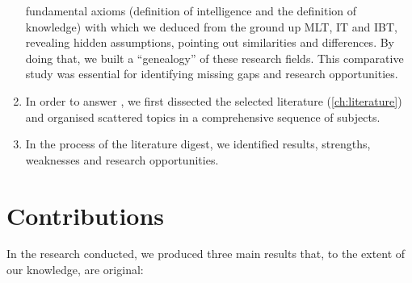 \documentclass[
  a4paperpaper,
  a4paper,
  12pt,
  twoside,
  brazil,
  british,
  open=right]{scrbook}
\begin{document}
\begin{enumerate}
  fundamental axioms (definition of intelligence and the definition of
  knowledge) with which we deduced from the ground up {MLT}, {IT} and
  {IBT}, revealing hidden assumptions, pointing out similarities and
  differences. By doing that, we built a ``genealogy'' of these research
  fields. This comparative study was essential for identifying missing
  gaps and research opportunities.
\item
  In order to answer , we first dissected the selected literature
  (\protect\hyperlink{ch:literature}{{[}ch:literature{]}}) and organised
  scattered topics in a comprehensive sequence of subjects.
\item
  In the process of the literature digest, we identified results,
  strengths, weaknesses and research opportunities.
\end{enumerate}

\hypertarget{contributions}{%
\section{Contributions}\label{contributions}}

In the research conducted, we produced three main results that, to the
extent of our knowledge, are original:
\end{document}
